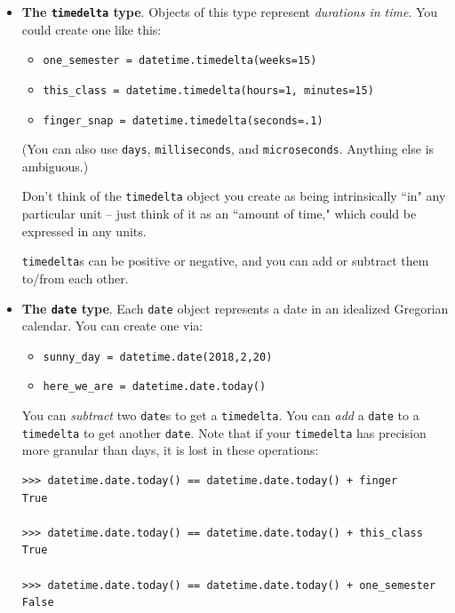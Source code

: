 \documentclass[12pt]{article}
\begin{document}
\begin{itemize}
\itemsep1em

\item \textbf{The \texttt{timedelta} type}. Objects of this type represent
\textit{durations in time}. You could create one like this:
    \begin{itemize}
    \itemsep.1em
    \item \texttt{one\_semester = datetime.timedelta(weeks=15)}
    \item \texttt{this\_class = datetime.timedelta(hours=1, minutes=15)}
    \item \texttt{finger\_snap = datetime.timedelta(seconds=.1)}
    \end{itemize}

    (You can also use \texttt{days}, \texttt{milliseconds}, and
\texttt{microseconds}. Anything else is ambiguous.)

    Don't think of the \texttt{timedelta} object you create as being
intrinsically ``in" any particular unit -- just think of it as an ``amount of
time," which could be expressed in any units.

    \texttt{timedelta}s can be positive or negative, and you can add or
subtract them to/from each other.

\item \textbf{The \texttt{date} type}. Each \texttt{date} object represents a
date in an idealized Gregorian calendar. You can create one via:
    \begin{itemize}
    \itemsep.1em
    \item \texttt{sunny\_day = datetime.date(2018,2,20)}
    \item \texttt{here\_we\_are = datetime.date.today()}
    \end{itemize}

    You can \textit{subtract} two \texttt{date}s to get a \texttt{timedelta}.
You can \textit{add} a \texttt{date} to a \texttt{timedelta} to get another
\texttt{date}. Note that if your \texttt{timedelta} has precision more
granular than days, it is lost in these operations:

\small
\begin{Verbatim}[fontsize=small,samepage=true,frame=none]
>>> datetime.date.today() == datetime.date.today() + finger
True

>>> datetime.date.today() == datetime.date.today() + this_class
True

>>> datetime.date.today() == datetime.date.today() + one_semester
False
\end{Verbatim}
\normalsize


\end{itemize}
\end{document}
